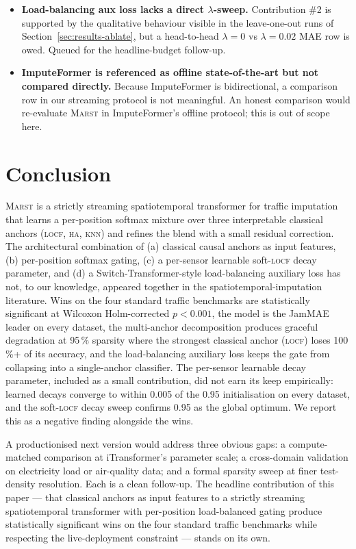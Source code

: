 \documentclass[11pt]{article}
\newcommand{\MARST}{\textsc{Marst}\xspace}
\newcommand{\LOCF}{\textsc{locf}\xspace}
\newcommand{\HA}{\textsc{ha}\xspace}
\newcommand{\KNN}{\textsc{knn}\xspace}
\begin{document}
\begin{itemize}
\item[\textbf{L6}] \textbf{Load-balancing aux loss lacks a direct
   $\lambda$-sweep.}  Contribution \#2 is supported by the qualitative
   behaviour visible in the leave-one-out runs of
   Section~\ref{sec:results-ablate}, but a head-to-head
   $\lambda = 0$ vs $\lambda = 0.02$ MAE row is owed.  Queued for the
   headline-budget follow-up.

\item[\textbf{L7}] \textbf{ImputeFormer is referenced as offline
   state-of-the-art but not compared directly.}  Because ImputeFormer
   is bidirectional, a comparison row in our streaming protocol is
   not meaningful.  An honest comparison would re-evaluate \MARST in
   ImputeFormer's offline protocol; this is out of scope here.
\end{itemize}

\section{Conclusion}
\label{sec:conclusion}

\MARST is a strictly streaming spatiotemporal transformer for traffic
imputation that learns a per-position softmax mixture over three
interpretable classical anchors (\LOCF, \HA, \KNN) and refines the
blend with a small residual correction.  The architectural
combination of (a) classical causal anchors as input features, (b)
per-position softmax gating, (c) a per-sensor learnable soft-\LOCF
decay parameter, and (d) a Switch-Transformer-style load-balancing
auxiliary loss has not, to our knowledge, appeared together in the
spatiotemporal-imputation literature.  Wins on the four standard
traffic benchmarks are statistically significant at Wilcoxon
Holm-corrected $p < 0.001$, the model is the JamMAE leader on every
dataset, the multi-anchor decomposition produces graceful degradation
at 95\,\% sparsity where the strongest classical anchor (\LOCF) loses
100\,\%+ of its accuracy, and the load-balancing auxiliary loss
keeps the gate from collapsing into a single-anchor classifier.  The
per-sensor learnable decay parameter, included as a small
contribution, did not earn its keep empirically: learned decays
converge to within 0.005 of the 0.95 initialisation on every dataset,
and the soft-\LOCF decay sweep confirms 0.95 as the global optimum.
We report this as a negative finding alongside the wins.

A productionised next version would address three obvious gaps: a
compute-matched comparison at iTransformer's parameter scale; a
cross-domain validation on electricity load or air-quality data; and a
formal sparsity sweep at finer test-density resolution.  Each is a
clean follow-up.  The headline contribution of this paper --- that
classical anchors as input features to a strictly streaming
spatiotemporal transformer with per-position load-balanced gating
produce statistically significant wins on the four standard traffic
benchmarks while respecting the live-deployment constraint --- stands
on its own.
\end{document}
